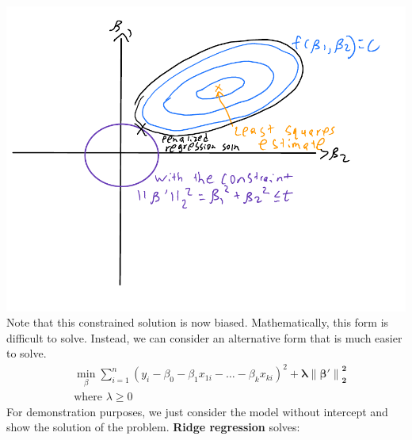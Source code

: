 \documentclass[12 pt]{article}
\begin{document}
  \includegraphics[width=.6\textwidth]{37.pdf}
  \\ Note that this constrained solution is now
  biased. Mathematically, this form is difficult to solve. Instead, we
  can consider an alternative form that is much easier to solve.
  \begin{align*}
    &\min_{\beta} \sum_{i=1}^n (y_i - \beta_0 - \beta_1 x_{1i} - \ldots
    - \beta_k x_{ki})^2 + \mathbf{\lambda \left\lVert \beta'
    \right\rVert_2^2}
    \\ & \text{where } \lambda \geq 0
  \end{align*}
  For demonstration purposes, we just consider the model without
  intercept and show the solution of the problem. \textbf{Ridge regression} solves:
\end{document}
